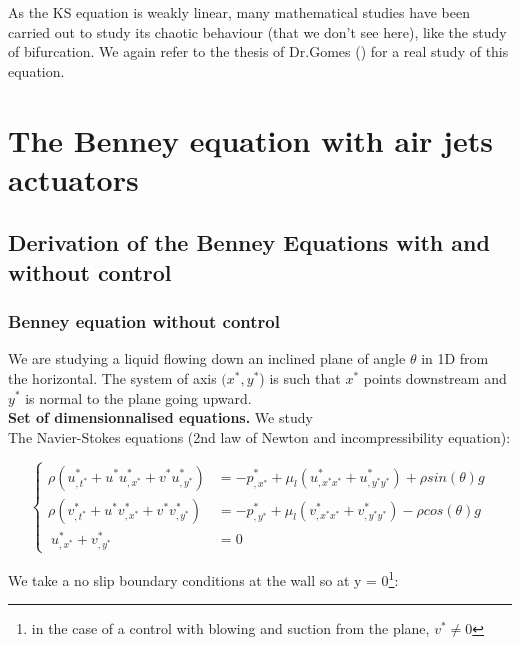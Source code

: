 \documentclass[12pt]{article}
\begin{document}
As the KS equation is weakly linear, many mathematical studies have been carried out to study its chaotic behaviour (that we don't see here), like the study of bifurcation. We again refer to the thesis of Dr.Gomes (\cite{Susana_thesis}) for a real study of this equation.




\newpage




\section{The Benney equation with air jets actuators}\label{Section_Benney_eq}



\subsection{Derivation of the Benney Equations with and without control}
\subsubsection{Benney equation without control}

We are studying a liquid flowing down an inclined plane of angle $\theta$ in 1D from the horizontal. The system of axis $(x^*, y^*$) is such that $x^*$ points downstream and $y^*$ is normal to the plane going upward. 
\\

\vspace{0.5cm}
{\textbf{Set of dimensionnalised equations.}}
We study\\ 

The Navier-Stokes equations (2nd law of Newton and incompressibility equation):

\begin{equation}
\left\{
\begin{aligned}
    \rho(u^*_{,t^*}+u^*u^*_{,x^*}+v^*u^*_{,y^*}) &= -p^*_{,x^*} + \mu_l(u^*_{,x^*x^*} + u^*_{,y^*y^*}) + \rho sin(\theta)g\\
    \rho(v^*_{,t^*}+u^*v^*_{,x^*}+v^*v^*_{,y^*}) &= -p^*_{,y^*} + \mu_l(v^*_{,x^*x^*} + v^*_{,y^*y^*}) - \rho cos(\theta)g\\\
    u^*_{,x^*} + v^*_{,y^*} &= 0 \quad 
\end{aligned}
\right.
\end{equation}

We take a no slip boundary conditions at the wall so at y = 0\footnote{in the case of a control with blowing and suction from the plane, $v^*\neq 0$ }: 
\end{document}
